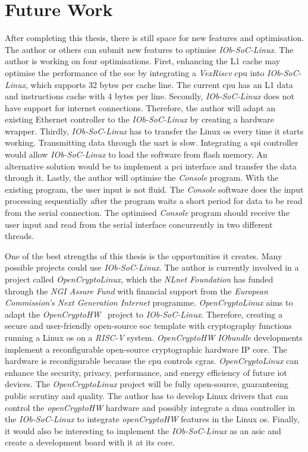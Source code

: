 \section{Future Work}
\label{section:future}
After completing this thesis, there is still space for new features and optimisation. The author or others can submit new features to optimise \textit{IOb-SoC-Linux}. The author is working on four optimisations. First, enhancing the L1 cache may optimise the performance of the \acrshort{soc} by integrating a \textit{VexRiscv} \acrshort{cpu} into \textit{IOb-SoC-Linux}, which supports 32 bytes per cache line. The current \acrshort{cpu} has an L1 data and instructions cache with 4 bytes per line. Secondly, \textit{IOb-SoC-Linux} does not have support for internet connections. Therefore, the author will adapt an existing Ethernet controller to the \textit{IOb-SoC-Linux} by creating a hardware wrapper. Thirdly, \textit{IOb-SoC-Linux} has to transfer the Linux \acrshort{os} every time it starts working. Transmitting data through the \acrshort{uart} is slow. Integrating a \acrfull{spi} controller would allow \textit{IOb-SoC-Linux} to load the software from flash memory. An alternative solution would be to implement a \acrshort{pci} interface and transfer the data through it. Lastly, the author will optimise the \textit{Console} program. With the existing program, the user input is not fluid. The \textit{Console} software does the input processing sequentially after the program waits a short period for data to be read from the serial connection. The optimised \textit{Console} program should receive the user input and read from the serial interface concurrently in two different threads.

One of the best strengths of this thesis is the opportunities it creates. Many possible projects could use \textit{IOb-SoC-Linux}. The author is currently involved in a project called \textit{OpenCryptoLinux}, which the \textit{NLnet Foundation} has funded through the \textit{NGI Assure Fund} with financial support from the \textit{European Commission's Next Generation Internet} programme. \textit{OpenCryptoLinux} aims to adapt the \textit{OpenCryptoHW}~\cite{open_crypto_hw} project to \textit{IOb-SoC-Linux}. Therefore, creating a secure and user-friendly open-source \acrshort{soc} template with cryptography functions running a Linux \acrshort{os} on a \textit{RISC-V} system. \textit{OpenCryptoHW} \textit{IObundle} developments implement a reconfigurable open-source cryptographic hardware IP core. The hardware is reconfigurable because the \acrshort{cpu} controls \acrfull{cgras}. \textit{OpenCryptoLinux} can enhance the security, privacy, performance, and energy efficiency of future \acrfull{iot} devices. The \textit{OpenCryptoLinux} project will be fully open-source, guaranteeing public scrutiny and quality. The author has to develop Linux drivers that can control the \textit{openCryptoHW} hardware and possibly integrate a \acrshort{dma} controller in the \textit{IOb-SoC-Linux} to integrate \textit{openCryptoHW} features in the Linux \acrshort{os}. Finally, it would also be interesting to implement the \textit{IOb-SoC-Linux} as an \acrshort{asic} and create a development board with it at its core.
